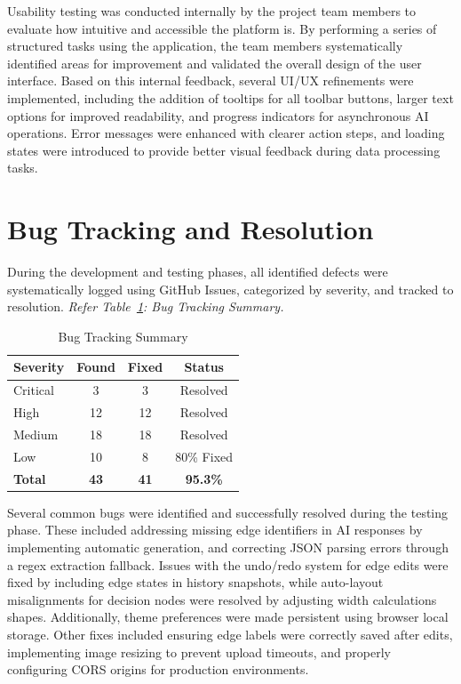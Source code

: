 Usability testing was conducted internally by the project team 
members to evaluate how intuitive and accessible the platform 
is. By performing a series of structured tasks using the 
application, the team members systematically identified areas 
for improvement and validated the overall design of the user 
interface. Based on this internal feedback, several UI/UX refinements 
were implemented, including the addition of tooltips for all 
toolbar buttons, larger text options for improved readability, 
and progress indicators for asynchronous AI operations. Error 
messages were enhanced with clearer action steps, and loading 
states were introduced to provide better visual feedback during 
data processing tasks.

\section{Bug Tracking and Resolution}
\label{sec:bug-tracking}

During the development and testing phases, all identified 
defects were systematically logged using GitHub Issues, 
categorized by severity, and tracked to resolution. \textit{Refer Table~\ref{tab:bugs}: Bug Tracking Summary.}

\begin{table}[!htbp]
\centering
\small
\renewcommand{\arraystretch}{1.3}
\begin{tabular}{|p{4cm}|c|c|c|}
    \hline
    \textbf{Severity} & \textbf{Found} & \textbf{Fixed} & 
    \textbf{Status} \\
    \hline
    Critical & 3 & 3 & Resolved \\
    \hline
    High & 12 & 12 & Resolved \\
    \hline
    Medium & 18 & 18 & Resolved \\
    \hline
    Low & 10 & 8 & 80\% Fixed \\
    \hline
    \textbf{Total} & \textbf{43} & \textbf{41} & 
    \textbf{95.3\%} \\
    \hline
\end{tabular}
\caption{Bug Tracking Summary}
\label{tab:bugs}
\end{table}

Several common bugs were identified and successfully resolved during the testing phase. These included addressing missing edge identifiers in AI responses by implementing automatic generation, and correcting JSON parsing errors through a regex extraction fallback. Issues with the undo/redo system for edge edits were fixed by including edge states in history snapshots, while auto-layout misalignments for decision nodes were resolved by adjusting width calculations shapes. Additionally, theme preferences were made persistent using browser local storage. Other fixes included ensuring edge labels were correctly saved after edits, implementing image resizing to prevent upload timeouts, and properly configuring CORS origins for production environments.

